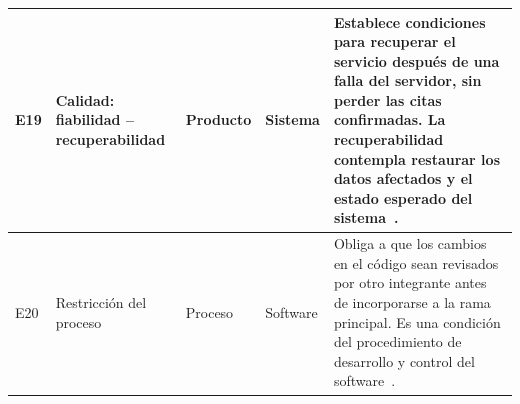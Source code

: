 \begin{longtable}{|L{0.08\tw}|L{0.23\tw}|L{0.12\tw}|L{0.12\tw}|L{0.45\tw}|}
E19 & Calidad: fiabilidad – recuperabilidad & Producto & Sistema & Establece condiciones para recuperar el servicio después de una falla del servidor, sin perder las citas confirmadas. La recuperabilidad contempla restaurar los datos afectados y el estado esperado del sistema~\cite{iso25010}. \\ \hline
E20 & Restricción del proceso & Proceso & Software & Obliga a que los cambios en el código sean revisados por otro integrante antes de incorporarse a la rama principal. Es una condición del procedimiento de desarrollo y control del software~\cite{iso29148}. \\ \hline
\end{longtable}
\endgroup


